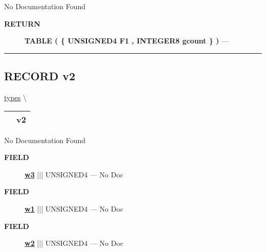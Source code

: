 \par





No Documentation Found








\par
\begin{description}
\item [\colorbox{tagtype}{\color{white} \textbf{\textsf{RETURN}}}] \textbf{TABLE ( \{ UNSIGNED4 F1 , INTEGER8 gcount \} )} --- 
\end{description}




\rule{\linewidth}{0.5pt}
\subsection*{\textsf{\colorbox{headtoc}{\color{white} RECORD}
v2}}

\hypertarget{ecldoc:types.v2}{}
\hspace{0pt} \hyperlink{ecldoc:types}{types} \textbackslash 

{\renewcommand{\arraystretch}{1.5}
\begin{tabularx}{\textwidth}{|>{\raggedright\arraybackslash}l|X|}
\hline
\hspace{0pt}\mytexttt{\color{red} } & \textbf{v2} \\
\hline
\end{tabularx}
}

\par





No Documentation Found







\par
\begin{description}
\item [\colorbox{tagtype}{\color{white} \textbf{\textsf{FIELD}}}] \textbf{\underline{w3}} ||| UNSIGNED4 --- No Doc
\item [\colorbox{tagtype}{\color{white} \textbf{\textsf{FIELD}}}] \textbf{\underline{w1}} ||| UNSIGNED4 --- No Doc
\item [\colorbox{tagtype}{\color{white} \textbf{\textsf{FIELD}}}] \textbf{\underline{w2}} ||| UNSIGNED4 --- No Doc
\end{description}





